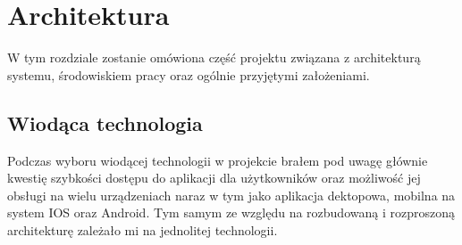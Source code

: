 \chapter{Architektura}
\label{ch:funplenop}

W tym rozdziale zostanie omówiona część projektu związana z architekturą systemu, środowiskiem pracy oraz ogólnie przyjętymi założeniami.

\section{Wiodąca technologia}


Podczas wyboru wiodącej technologii w projekcie brałem pod uwagę głównie kwestię szybkości dostępu do aplikacji dla użytkowników oraz możliwość jej obsługi na wielu urządzeniach naraz w tym jako aplikacja dektopowa, mobilna na system IOS oraz Android. Tym samym ze względu na rozbudowaną i rozproszoną architekturę zależało mi na jednolitej technologii.

